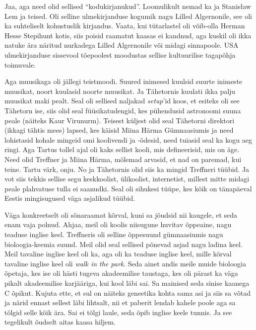 
Jaa, aga need olid sellised \enquote{kodukirjanukud}. Loomulikult nemad 
ka ja Stanisław Lem ja teised. Oli selline ulmekirjanduse kogumik nagu Lilled 
Algernonile, see oli ka suhteliselt kohustuslik kirjandus. Vaata, kui 
tütarlastel oli võib-olla Herman Hesse Stepihunt kotis, siis poisid raamatut 
kaasas ei kandnud, aga kuskil oli ikka natuke ära näritud nurkadega Lilled 
Algernonile või midagi sinnapoole. USA ulmekirjanduse sissevool tõepoolest 
moodustas sellise kultuurilise tagapõhja toimuvale.

Aga muusikaga oli jällegi teistmoodi. Suured inimesed kuulsid suurte inimeste 
muusikat, noort kuulasid noorte muusikat. Ja Tähetornis  
kuulati ikka palju muusikat maki pealt. Seal oli sellised naljakad 
\emph{setup}'id koos, et esiteks oli see Tähetorn ise, siis olid seal 
füüsikatudengid, kes pühendusid astronoomi suuna peale (näiteks Kaur 
Virunurm). Teisest küljest olid seal Tähetorni 
direktori (ikkagi tähtis mees) lapsed, kes käisid Miina Härma 
Gümnaasiumis ja need lohistasid kohale 
mingeid omi koolivendi ja -õdesid, need tuiasid seal ka kogu aeg ringi. Aga 
Tartus tollel ajal oli kaks sellist kooli, mis  defineerisid, mis on äge. Need 
olid Treffner ja Miina Härma, mõlemad 
arvasid, et nad on paremad, kui teine. Tartu värk, onju. No ja Tähetornis olid 
siis ka mingid Treffneri tüübid. Ja vot siis tekkis sellise segu keskkoolist, 
ülikoolist, internetist, millest mitte midagi peale plahvatuse tulla ei 
saanudki. Seal oli sihukesi tüüpe, kes kõik on tänapäeval Eestis mingisugused 
väga asjalikud tüübid.


Väga konkreetselt oli sõnaraamat kõrval, kuni sa jõudsid nii kaugele, et seda 
enam vaja polnud. Ahjaa, meil oli koolis  niisugune huvitav õppeaine, nagu 
teaduse inglise keel. Treffneris oli selline õppesuund gümnaasiumis nagu 
bioloogia-keemia suund. Meil olid seal sellised põnevad asjad nagu ladina keel. 
Meil tavaline inglise keel oli ka, aga oli ka teaduse inglise keel, mille 
kõrval tavaline inglise keel oli \emph{walk in the park}. Seda ainet andis 
meile muide bioloogia õpetaja, kes ise oli hästi tugeva akadeemilise taustaga, 
kes oli pärast ka väga pikalt akadeemilise karjääriga, kui kool läbi sai. Sa 
mainised seda sinise kaanega C õpikut. Kujuta ette, et sul on näiteks geneetika 
kohta sama asi ja siis sa võtad ja närid ennast sellest läbi lihtsalt, nii et 
paberit lendab kahele poole aga sa tõlgid selle kõik ära. Sai ei tõlgi laule, 
seda õpib inglise keele tunnis. Ja see tegelikult õudselt aitas kaasa hiljem.

